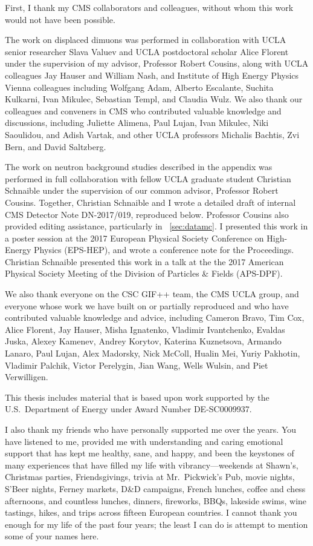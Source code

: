 First, I thank my CMS collaborators and colleagues, without whom this work would not have been possible.

The work on displaced dimuons was performed in collaboration with UCLA senior researcher Slava Valuev and UCLA postdoctoral scholar Alice Florent under the supervision of my advisor, Professor Robert Cousins, along with UCLA colleagues Jay Hauser and William Nash, and Institute of High Energy Physics Vienna colleagues including Wolfgang Adam, Alberto Escalante, Suchita Kulkarni, Ivan Mikulec, Sebastian Templ, and Claudia Wulz.
We also thank our colleagues and conveners in CMS who contributed valuable knowledge and discussions, including Juliette Alimena, Paul Lujan, Ivan Mikulec, Niki Saoulidou, and Adish Vartak, and other UCLA professors Michalis Bachtis, Zvi Bern, and David Saltzberg.

The work on neutron background studies described in the appendix was performed in full collaboration with fellow UCLA graduate student Christian Schnaible under the supervision of our common advisor, Professor Robert Cousins.
Together, Christian Schnaible and I wrote a detailed draft of internal CMS Detector Note DN-2017/019, reproduced below.
Professor Cousins also provided editing assistance, particularly in \Sec~\ref{sec:datamc}.
I presented this work in a poster session at the 2017 European Physical Society Conference on High-Energy Physics (EPS-HEP), and wrote a conference note for the Proceedings.
Christian Schnaible presented this work in a talk at the the 2017 American Physical Society Meeting of the Division of Particles \& Fields (APS-DPF).

We also thank everyone on the CSC GIF++ team, the CMS UCLA group, and everyone whose work we have built on or partially reproduced and who have contributed valuable knowledge and advice, including Cameron Bravo, Tim Cox, Alice Florent, Jay Hauser, Misha Ignatenko, Vladimir Ivantchenko, Evaldas Juska, Alexey Kamenev, Andrey Korytov, \mbox{Katerina} Kuznetsova, Armando Lanaro, Paul Lujan, Alex Madorsky, Nick McColl, Hualin Mei, Yuriy Pakhotin, Vladimir Palchik, Victor Perelygin, Jian Wang, Wells Wulsin, and Piet Verwilligen.

This thesis includes material that is based upon work supported by the U.S.\ Department of Energy under Award Number {DE}-{SC}0009937.

I also thank my friends who have personally supported me over the years.
You have listened to me, provided me with understanding and caring emotional support that has kept me healthy, sane, and happy, and been the keystones of many experiences that have filled my life with vibrancy---weekends at Shawn's, Christmas parties, Friendsgivings, trivia at Mr.\ Pickwick's Pub, movie nights, S'Beer nights, Ferney markets, D\&D campaigns, French lunches, coffee and chess afternoons, and countless lunches, dinners, fireworks, BBQs, lakeside swims, wine tastings, hikes, and trips across fifteen European countries.
I cannot thank you enough for my life of the past four years; the least I can do is attempt to mention some of your names here.


